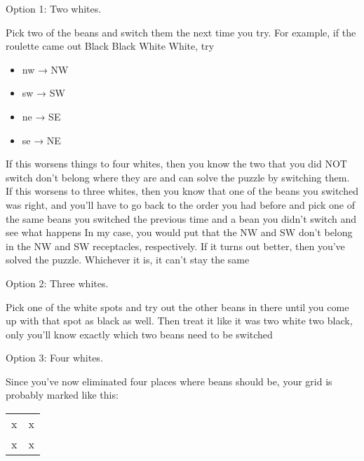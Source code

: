 \documentclass[12pt]{article}
\providecommand{\tightlist}{%
  \setlength{\itemsep}{0pt}\setlength{\parskip}{0pt}}
\begin{document}
Option 1: Two whites.

Pick two of the beans and switch them the next time you try. For
example, if the roulette came out Black Black White White, try

\begin{itemize}
\tightlist
\item
  nw → NW
\item
  sw → SW
\item
  ne → SE
\item
  se → NE
\end{itemize}

If this worsens things to four whites, then you know the two that you
did NOT switch don't belong where they are and can solve the puzzle by
switching them. If this worsens to three whites, then you know that one
of the beans you switched was right, and you'll have to go back to the
order you had before and pick one of the same beans you switched the
previous time and a bean you didn't switch and see what happens In my
case, you would put that the NW and SW don't belong in the NW and SW
receptacles, respectively. If it turns out better, then you've solved
the puzzle. Whichever it is, it can't stay the same

Option 2: Three whites.

Pick one of the white spots and try out the other beans in there until
you come up with that spot as black as well. Then treat it like it was
two white two black, only you'll know exactly which two beans need to be
switched

Option 3: Four whites.

Since you've now eliminated four places where beans should be, your grid
is probably marked like this:

\begin{longtable}[]{@{}ll@{}}
\toprule
\begin{minipage}[t]{0.05\columnwidth}\raggedright\strut
x
\strut\end{minipage} &
\begin{minipage}[t]{0.05\columnwidth}\raggedright\strut
x
\strut\end{minipage}\tabularnewline
\begin{minipage}[t]{0.05\columnwidth}\raggedright\strut
x
\strut\end{minipage} &
\begin{minipage}[t]{0.05\columnwidth}\raggedright\strut
x
\strut\end{minipage}\tabularnewline
\bottomrule
\end{longtable}
\end{document}
